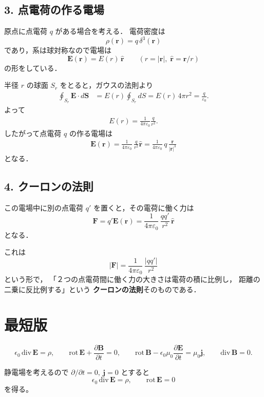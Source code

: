 \documentclass[a4paper,12pt]{jlreq}
\begin{document}
\subsection*{3. 点電荷の作る電場}

原点に点電荷 $q$ がある場合を考える．
電荷密度は
\[
\rho(\bm{r}) = q\,\delta^{3}(\bm{r})
\]
であり，系は球対称なので電場は
\[
\bm{E}(\bm{r}) = E(r)\,\hat{\bm{r}}
\qquad (r = |\bm{r}|,\; \hat{\bm{r}}=\bm{r}/r)
\]
の形をしている．

半径 $r$ の球面 $S_r$ をとると，ガウスの法則より
\begin{align}
 \oint_{S_r} \bm{E}\cdot d\bm{S}
 &= E(r) \oint_{S_r} dS
  = E(r)\, 4\pi r^2
  = \frac{q}{\varepsilon_0}.
\end{align}
よって
\begin{align}
 E(r) = \frac{1}{4\pi\varepsilon_0}\frac{q}{r^{2}}.
\end{align}
したがって点電荷 $q$ の作る電場は
\begin{align}
 \bm{E}(\bm{r})
 = \frac{1}{4\pi\varepsilon_0}\,
   \frac{q}{r^{2}}\hat{\bm{r}}
 = \frac{1}{4\pi\varepsilon_0}\,
   q\,\frac{\bm{r}}{|\bm{r}|^{3}}
\end{align}
となる．

\subsection*{4. クーロンの法則}

この電場中に別の点電荷 $q'$ を置くと，その電荷に働く力は
\[
\bm{F} = q'\bm{E}(\bm{r})
 = \frac{1}{4\pi\varepsilon_0}\,
   \frac{q q'}{r^{2}}\,\hat{\bm{r}}
\]
となる．

これは
\[
|\bm{F}| = \frac{1}{4\pi\varepsilon_0}\,
          \frac{|q q'|}{r^{2}}
\]
という形で，
「２つの点電荷間に働く力の大きさは電荷の積に比例し，
距離の二乗に反比例する」という
\textbf{クーロンの法則}そのものである．



\newpage
\section*{最短版}
\[
 \epsilon_0 \,\mathrm{div}\,\mathbf{E} = \rho, \qquad
 \mathrm{rot}\,\mathbf{E} + \frac{\partial \mathbf{B}}{\partial t}=0, \qquad
 \mathrm{rot}\,\mathbf{B}-\epsilon_0\mu_0\frac{\partial \mathbf{E}}{\partial t}=\mu_0\mathbf{j},\qquad
 \mathrm{div}\,\mathbf{B}=0.
\]

静電場を考えるので $\partial/\partial t =0,\ \mathbf{j}=0$ とすると
\[
 \epsilon_0 \,\mathrm{div}\,\mathbf{E} = \rho,\qquad
 \mathrm{rot}\,\mathbf{E}=0
\]
を得る。
\end{document}
